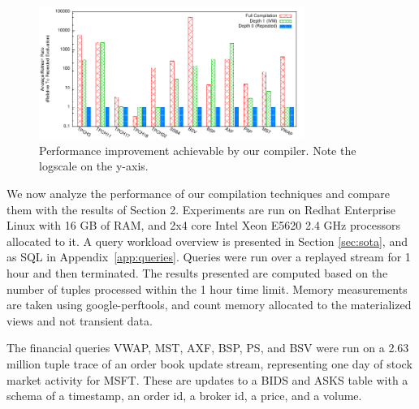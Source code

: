 
\newcommand{\figurewidth}[0]{1.8in}

\newcommand{\tablefig}[1]{
  \hspace*{-0.25in}
  \texttt{[image: ../graphs/graphs/\#1]}
}

\begin{figure}
\begin{center}
\includegraphics[width=3.4in]{../graphs/graphs/bakeoff.pdf}
\caption{Performance improvement achievable by our compiler.  Note the logscale on the y-axis. }
\label{fig:experiments:bakeoff}
\end{center}
\vspace*{-0.3in}
\end{figure}

We now analyze the performance of our compilation techniques and compare them with the results of Section 2.  Experiments are run on Redhat Enterprise Linux with 16 GB of RAM, and 2x4 core Intel Xeon E5620 2.4 GHz processors allocated to it.
A query workload overview is presented in Section \ref{sec:sota}, and as SQL in Appendix~\ref{app:queries}.
Queries were run over a replayed stream for 1 hour and then terminated. The results presented are computed based on the number of tuples processed within the 1 hour time limit.
Memory measurements are taken using google-perftools, and count memory allocated to the materialized views and not transient data.  

The financial queries VWAP, MST, AXF, BSP, PS, and BSV were run on a 2.63 million tuple trace of an order book update stream, representing one day of stock market activity for MSFT.  These are updates to a BIDS and ASKS table with a schema of a timestamp, an order id, a broker id, a price, and a volume.


